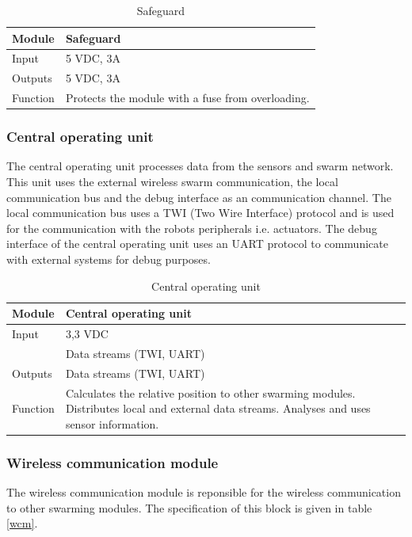 \documentclass[10pt,a4paper]{article}
\begin{document}
\begin{table}[H]
\centering
\caption{Safeguard}
\label{safeguard}
\begin{tabular}{|p{}|p{}|}
\hline
Module   & Safeguard                                        \\ \hline
Input    & 5 VDC, 3A                                            \\ \hline
Outputs  & 5 VDC, 3A                                             \\ \hline
Function & Protects the module with a fuse from overloading. \\ \hline
\end{tabular}
\end{table}

\subsubsection{Central operating unit}
The central operating unit processes data from the sensors and swarm network. This unit uses the external wireless swarm communication, the local communication bus and the debug interface as an communication channel. The local communication bus uses a TWI (Two Wire Interface) protocol and is used for the communication with the robots peripherals i.e. actuators. The debug interface of the central operating unit uses an UART protocol to communicate with external systems for debug purposes.

\begin{table}[H]
\centering
\caption{Central operating unit}
\label{cou}
\begin{tabular}{|p{}|p{}|}
\hline
Module   & Central operating unit                                        \\ \hline
Input    & 3,3 VDC \\
         & Data streams (TWI, UART)                                           \\ \hline
Outputs  & Data streams (TWI, UART)                                             \\ \hline
Function & Calculates the relative position to other swarming modules. Distributes local and external data streams. Analyses and uses sensor information.\\ \hline
\end{tabular}
\end{table}

\subsubsection{Wireless communication module}
The wireless communication module is reponsible for the wireless communication to other swarming modules. The specification of this block is given in table \ref{wcm}.
\end{document}
